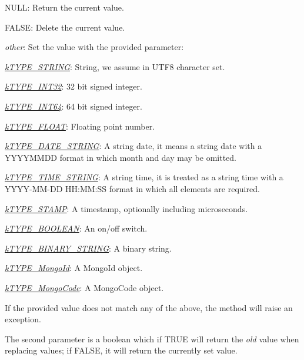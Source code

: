 \begin{DoxyItemize}
\item {\ttfamily N\-U\-L\-L}\-: Return the current value. 
\item {\ttfamily F\-A\-L\-S\-E}\-: Delete the current value. 
\item {\itshape other}\-: Set the value with the provided parameter\-: 
\begin{DoxyItemize}
\item {\itshape \hyperlink{}{k\-T\-Y\-P\-E\-\_\-\-S\-T\-R\-I\-N\-G}}\-: String, we assume in U\-T\-F8 character set. 
\item {\itshape \hyperlink{}{k\-T\-Y\-P\-E\-\_\-\-I\-N\-T32}}\-: 32 bit signed integer. 
\item {\itshape \hyperlink{}{k\-T\-Y\-P\-E\-\_\-\-I\-N\-T64}}\-: 64 bit signed integer. 
\item {\itshape \hyperlink{}{k\-T\-Y\-P\-E\-\_\-\-F\-L\-O\-A\-T}}\-: Floating point number. 
\item {\itshape \hyperlink{}{k\-T\-Y\-P\-E\-\_\-\-D\-A\-T\-E\-\_\-\-S\-T\-R\-I\-N\-G}}\-: A string date, it means a string date with a Y\-Y\-Y\-Y\-M\-M\-D\-D format in which month and day may be omitted. 
\item {\itshape \hyperlink{}{k\-T\-Y\-P\-E\-\_\-\-T\-I\-M\-E\-\_\-\-S\-T\-R\-I\-N\-G}}\-: A string time, it is treated as a string time with a Y\-Y\-Y\-Y-\/\-M\-M-\/\-D\-D H\-H\-:\-M\-M\-:S\-S format in which all elements are required. 
\item {\itshape \hyperlink{}{k\-T\-Y\-P\-E\-\_\-\-S\-T\-A\-M\-P}}\-: A timestamp, optionally including microseconds. 
\item {\itshape \hyperlink{}{k\-T\-Y\-P\-E\-\_\-\-B\-O\-O\-L\-E\-A\-N}}\-: An {\ttfamily on}/{\ttfamily off} switch. 
\item {\itshape \hyperlink{}{k\-T\-Y\-P\-E\-\_\-\-B\-I\-N\-A\-R\-Y\-\_\-\-S\-T\-R\-I\-N\-G}}\-: A binary string. 
\item {\itshape \hyperlink{}{k\-T\-Y\-P\-E\-\_\-\-Mongo\-Id}}\-: A Mongo\-Id object. 
\item {\itshape \hyperlink{}{k\-T\-Y\-P\-E\-\_\-\-Mongo\-Code}}\-: A Mongo\-Code object. 
\end{DoxyItemize}If the provided value does not match any of the above, the method will raise an exception. 
\end{DoxyItemize}

The second parameter is a boolean which if {\ttfamily T\-R\-U\-E} will return the {\itshape old} value when replacing values; if {\ttfamily F\-A\-L\-S\-E}, it will return the currently set value.



